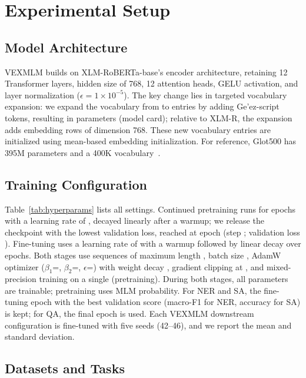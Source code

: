 \section{Experimental Setup}

\subsection{Model Architecture}
VEXMLM builds on XLM-RoBERTa-base's encoder architecture, retaining 12 Transformer layers, hidden size of 768, 12 attention heads, GELU activation, and layer normalization ($\epsilon=1\times10^{-5}$). The key change lies in targeted vocabulary expansion: we expand the vocabulary from \vocabBase{} to \vocabFinal{} entries by adding \vocabAdded{} Ge'ez-script tokens, resulting in \paramVex{} parameters (model card); relative to XLM-R, the expansion adds \vocabAdded{} embedding rows of dimension 768. These new vocabulary entries are initialized using mean-based embedding initialization. For reference, Glot500 has 395M parameters and a 400K vocabulary~\cite{imanigooghari2023glot500}.

\subsection{Training Configuration}
Table~\ref{tab:hyperparams} lists all settings. Continued pretraining runs for \ptEpochsConfigured{} epochs with a learning rate of \ptLR{}, decayed linearly after a \ptWarmup{} warmup; we release the checkpoint with the lowest validation loss, reached at epoch \ptBestEpoch{} (step \ptBestStep; validation loss \ptBestLoss). Fine-tuning uses a learning rate of \ftLR{} with a \ftWarmup{} warmup followed by linear decay over \ftEpochs{} epochs. Both stages use sequences of maximum length \ptMaxLen, batch size \ptBatch, AdamW optimizer ($\beta_1$=\ptAdamBetaOne, $\beta_2$=\ptAdamBetaTwo, $\epsilon$=\ptAdamEps) with weight decay \ptWeightDecay, gradient clipping at \ptClip, and \ptPrecision{} mixed-precision training on a single \ptGPU{} (pretraining). During both stages, all parameters are trainable; pretraining uses \ptMLMProb{} MLM probability. For NER and SA, the fine-tuning epoch with the best validation score (macro-F1 for NER, accuracy for SA) is kept; for QA, the final epoch is used. Each VEXMLM downstream configuration is fine-tuned with five seeds (42--46), and we report the mean and standard deviation.

\subsection{Datasets and Tasks}
\label{sec:data}
